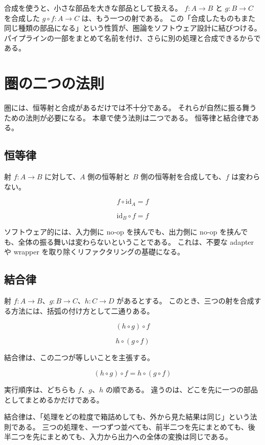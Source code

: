 
合成を使うと、小さな部品を大きな部品として扱える。
\(f : A \to B\) と \(g : B \to C\) を合成した \(g \circ f : A \to C\) は、もう一つの射である。
この「合成したものもまた同じ種類の部品になる」という性質が、圏論をソフトウェア設計に結びつける。
パイプラインの一部をまとめて名前を付け、さらに別の処理と合成できるからである。

\section{圏の二つの法則}

圏には、恒等射と合成があるだけでは不十分である。
それらが自然に振る舞うための法則が必要になる。
本章で使う法則は二つである。
恒等律と結合律である。

\subsection{恒等律}

射 \(f : A \to B\) に対して、\(A\) 側の恒等射と \(B\) 側の恒等射を合成しても、\(f\) は変わらない。

\[
  f \circ \mathrm{id}_A = f
\]

\[
  \mathrm{id}_B \circ f = f
\]

ソフトウェア的には、入力側に no-op を挟んでも、出力側に no-op を挟んでも、全体の振る舞いは変わらないということである。
これは、不要な adapter や wrapper を取り除くリファクタリングの基礎になる。

\subsection{結合律}

射 \(f : A \to B\)、\(g : B \to C\)、\(h : C \to D\) があるとする。
このとき、三つの射を合成する方法には、括弧の付け方として二通りある。

\[
  (h \circ g) \circ f
\]

\[
  h \circ (g \circ f)
\]

結合律は、この二つが等しいことを主張する。

\[
  (h \circ g) \circ f = h \circ (g \circ f)
\]

実行順序は、どちらも \(f\)、\(g\)、\(h\) の順である。
違うのは、どこを先に一つの部品としてまとめるかだけである。

\begin{intuitionbox}
結合律は、「処理をどの粒度で箱詰めしても、外から見た結果は同じ」という法則である。
三つの処理を、一つずつ並べても、前半二つを先にまとめても、後半二つを先にまとめても、入力から出力への全体の変換は同じである。
\end{intuitionbox}

